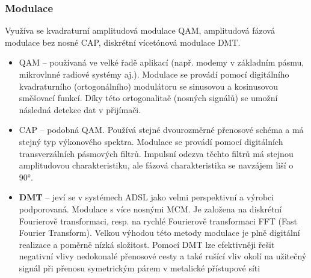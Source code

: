 \subsubsection{Modulace}
Využíva se kvadraturní amplitudová modulace QAM, amplitudová fázová modulace bez nosné CAP, diskrétní vícetónová modulace DMT.
\begin{itemize}
    \item QAM -- používaná ve velké řadě aplikací (např. modemy v základním pásmu, mikrovlnné radiové systémy aj.). Modulace se provádí pomocí digitálního kvadraturního (ortogonálního) modulátoru se sinusovou a kosinusovou směšovací funkcí. Díky této ortogonalitaě (nosných signálů) se umožní následná detekce dat v přijímači.
    \item CAP -- podobná QAM. Používá stejné dvourozměrné přenosové schéma a má stejný typ výkonového spektra. Modulace se provádí pomocí digitálních transverzálních pásmových filtrů. Impulsní odezva těchto filtrů má stejnou amplitudovou charakteristiku, ale fázová charakteristika se navzájem liší o 90°. 
    \item \textbf{DMT} -- jeví se v systémech ADSL jako velmi perspektivní a výrobci podporovaná. Modulace s více nosnými MCM. Je založena na diskrétní Fourierově transformaci, resp. na rychlé Fourierově transformaci FFT (Fast Fourier Transform). Velkou výhodou této metody modulace je plně digitální realizace a poměrně nízká složitost. Pomocí DMT lze efektivněji řešit negativní vlivy nedokonalé přenosové cesty a také rušící vliv okolí na užitečný signál při přenosu symetrickým párem v metalické přístupové síti
\end{itemize}
\newpage

